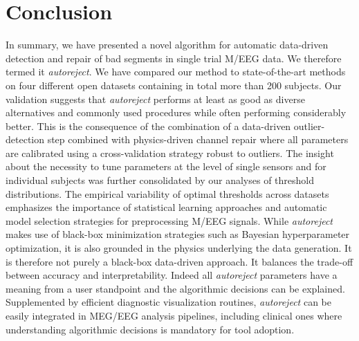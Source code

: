 \section{Conclusion}
\label{sec:autoreject_conclusion}

In summary, we have presented a novel algorithm for automatic data-driven detection and repair of bad segments in single trial M/EEG data. We therefore termed it \emph{autoreject}. We have compared our method to state-of-the-art methods on four different open datasets containing in total more than 200 subjects. Our validation suggests that \emph{autoreject} performs at least as good as diverse alternatives and commonly used procedures while often performing considerably better. This is the consequence of the combination of a data-driven outlier-detection step combined with physics-driven channel repair where all parameters are calibrated using a cross-validation strategy robust to outliers. The insight about the necessity to tune parameters at the level of single sensors and for individual subjects was further consolidated by our analyses of threshold distributions. The empirical variability of optimal thresholds across datasets emphasizes the importance of statistical learning approaches and automatic model selection strategies for preprocessing M/EEG signals. While \emph{autoreject} makes use of black-box minimization strategies such as Bayesian hyperparameter optimization, it is also grounded in the physics underlying the data generation. It is therefore not purely a black-box data-driven approach. It balances the trade-off between accuracy and interpretability. Indeed all \emph{autoreject} parameters have a meaning from a user standpoint and the algorithmic decisions can be explained. Supplemented by efficient diagnostic visualization routines, \emph{autoreject} can be easily integrated in MEG/EEG analysis pipelines,
including clinical ones where understanding algorithmic decisions is mandatory for tool adoption.

